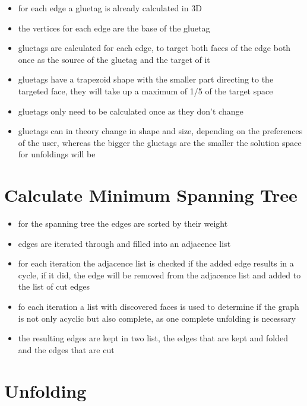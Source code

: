 \documentclass[draft,final]{vutinfth} %
\begin{document}
\begin{itemize}
	\item for each edge a gluetag is already calculated in 3D
	\item the vertices for each edge are the base of the gluetag
	\item gluetags are calculated for each edge, to target both faces of the edge both once as the source of the gluetag and the target of it
	\item gluetags have a trapezoid shape with the smaller part directing to the targeted face, they will take up a maximum of 1/5 of the target space
	\item gluetags only need to be calculated once as they don't change
	\item gluetags can in theory change in shape and size, depending on the preferences of the user, whereas the bigger the gluetags are the smaller the solution space for unfoldings will be
\end{itemize}

\section{Calculate Minimum Spanning Tree}

\begin{itemize}
	\item for the spanning tree the edges are sorted by their weight
	\item edges are iterated through and filled into an adjacence list
	\item for each iteration the adjacence list is checked if the added edge results in a cycle, if it did, the edge will be removed from the adjacence list and added to the list of cut edges
	\item fo each iteration a list with discovered faces is used to determine if the graph is not only acyclic but also complete, as one complete unfolding is necessary
	\item the resulting edges are kept in two list, the edges that are kept and folded and the edges that are cut
\end{itemize}

\section{Unfolding}
\end{document}
